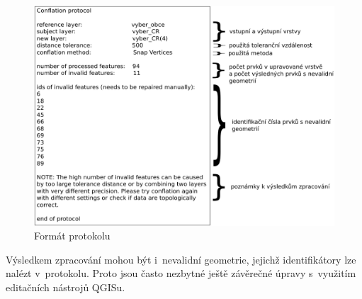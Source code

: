 \label{protokol}
  \begin{figure}[hbt]
    \centering
      \includegraphics[width=450pt]{./pictures/protokol.pdf}
      \caption{Formát protokolu}
      \label{fig:protokol}
  \end{figure} 

Výsledkem zpracování mohou být i~nevalidní geometrie, jejichž identifikátory lze
nalézt v~protokolu. Proto jsou často nezbytné ještě závěrečné úpravy s~využitím
editačních nástrojů QGISu. 

